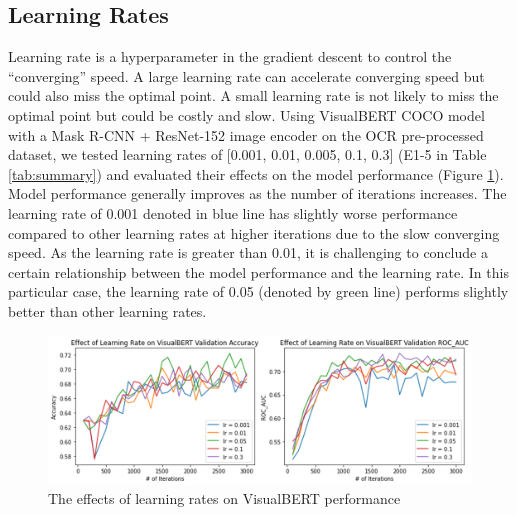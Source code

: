 \documentclass[10pt,twocolumn,letterpaper]{article}
\begin{document}
\subsection{Learning Rates}
Learning rate is a hyperparameter in the gradient descent to control the “converging” speed. A large learning rate can accelerate converging speed but could also miss the optimal point. A small learning rate is not likely to miss the optimal point but could be costly and slow. Using VisualBERT COCO model with a Mask R-CNN + ResNet-152 image encoder on the OCR pre-processed dataset, we tested learning rates of [0.001, 0.01, 0.005, 0.1, 0.3] (E1-5 in Table \ref{tab:summary}) and evaluated their effects on the model performance (Figure \ref{fig:lr}). Model performance generally improves as the number of iterations increases. The learning rate of 0.001 denoted in blue line has slightly worse performance compared to other learning rates at higher iterations due to the slow converging speed. As the learning rate is greater than 0.01, it is challenging to conclude a certain relationship between the model performance and the learning rate. In this particular case, the learning rate of 0.05 (denoted by green line) performs slightly better than other learning rates.


\begin{figure}[t]
\begin{center}
   \includegraphics[width=1 \linewidth]{Figure5.png}
\end{center}
   \caption{The effects of learning rates on VisualBERT performance}
\label{fig:lr}
\end{figure}
\end{document}
